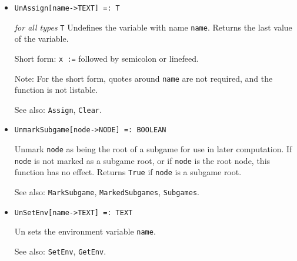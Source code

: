 \begin{itemize}

\item{}
\protect \large \begin{verbatim}
UnAssign[name->TEXT] =: T
\end{verbatim}\normalsize

{\it for all types} {\tt T}
\bd
Undefines the variable with name \verb+name+.  Returns the
last value of the variable.
\item [Short form:] \verb+x :=+ followed by semicolon or linefeed. 
\item [Note:] For the short form, quotes around \verb+name+ are not
required, and the function is not listable.
\item [See also:] \verb+Assign+, \verb+Clear+.
\ed

\item{}
\protect \large \begin{verbatim}
UnmarkSubgame[node->NODE] =: BOOLEAN
\end{verbatim}\normalsize

\bd
Unmark \verb+node+ as being the root of a subgame for use in later
computation.  If \verb+node+ is not marked as a subgame root, or if
\verb+node+ is the root node, this function has no effect.  Returns
\verb+True+ if \verb+node+ is a subgame root.
\item [See also:] \verb+MarkSubgame+, \verb+MarkedSubgames+,
\verb+Subgames+.
\ed



\item{}
\protect \large \begin{verbatim}
UnSetEnv[name->TEXT] =: TEXT
\end{verbatim} \normalsize

\bd
Un sets the environment variable \verb+name+.
\item [See also:] \verb+SetEnv+, \verb+GetEnv+.
\ed


\end{itemize}
